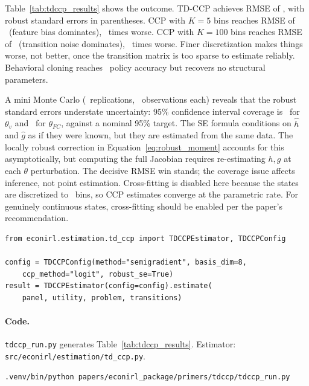 \documentclass[10pt]{article}
\begin{document}
Table~\ref{tab:tdccp_results} shows the outcome.
TD-CCP achieves RMSE of \tdRMSE, with robust standard errors in parentheses.
CCP with $K = 5$ bins reaches RMSE of \ccpFiveRMSE\ (feature bias dominates), \ccpFiveWin\ times worse.
CCP with $K = 100$ bins reaches RMSE of \ccpHundredRMSE\ (transition noise dominates), \ccpHundredWin\ times worse.
Finer discretization makes things worse, not better, once the transition matrix is too sparse to estimate reliably.
Behavioral cloning reaches \bcAcc\ policy accuracy but recovers no structural parameters.

A mini Monte Carlo (\mcNreps\ replications, \mcNobs\ observations each) reveals that the robust standard errors understate uncertainty: 95\% confidence interval coverage is \mcCovV\ for $\theta_v$ and \mcCovFC\ for $\theta_{FC}$, against a nominal 95\% target. The SE formula conditions on $\hat h$ and $\hat g$ as if they were known, but they are estimated from the same data. The locally robust correction in Equation~\eqref{eq:robust_moment} accounts for this asymptotically, but computing the full Jacobian requires re-estimating $h,g$ at each $\theta$ perturbation. The decisive RMSE win stands; the coverage issue affects inference, not point estimation. Cross-fitting is disabled here because the states are discretized to \tdNstates\ bins, so CCP estimates converge at the parametric rate. For genuinely continuous states, cross-fitting should be enabled per the paper's recommendation.

\begin{lstlisting}[basicstyle=\footnotesize\ttfamily]
from econirl.estimation.td_ccp import TDCCPEstimator, TDCCPConfig

config = TDCCPConfig(method="semigradient", basis_dim=8,
    ccp_method="logit", robust_se=True)
result = TDCCPEstimator(config=config).estimate(
    panel, utility, problem, transitions)
\end{lstlisting}

\paragraph{Code.}
\texttt{tdccp\_run.py} generates Table~\ref{tab:tdccp_results}. Estimator: \texttt{src/econirl/estimation/td\_ccp.py}.
\begin{verbatim}
.venv/bin/python papers/econirl_package/primers/tdccp/tdccp_run.py
\end{verbatim}



\end{document}
